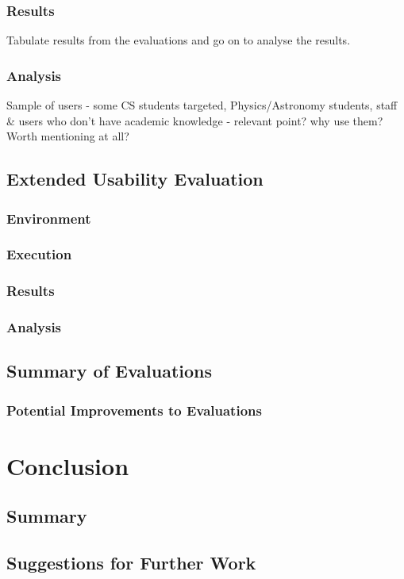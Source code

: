 \documentclass{l4proj}
\begin{document}
\subsection{Results}
Tabulate results from the evaluations and go on to analyse the results.

\subsection{Analysis}
Sample of users - some CS students targeted, Physics/Astronomy students, staff \& users who don't have academic knowledge - relevant point? why use them? Worth mentioning at all?

\section{Extended Usability Evaluation}
\subsection{Environment}
\subsection{Execution}
\subsection{Results}
\subsection{Analysis}

\section{Summary of Evaluations}

\subsection{Potential Improvements to Evaluations}



\chapter{Conclusion}
\label{conclusion}

\section{Summary}

\section{Suggestions for Further Work}

\appendix
\printglossaries



\end{document}
